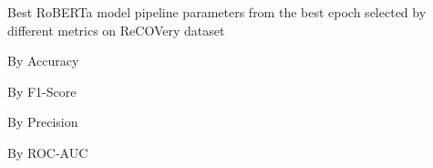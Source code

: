 \begin{table}[!htbp]
    \caption{Best RoBERTa model pipeline parameters from the best epoch selected by different metrics on ReCOVery dataset}
    \label{tab:recovery_roberta_pipeline_params}
    \centering

    \begin{subtable}[t]{0.48\linewidth}
        \scriptsize
        \caption{By Accuracy}
        
    \end{subtable}
    \hfill
    \begin{subtable}[t]{0.48\linewidth}
        \scriptsize
        \caption{By F1-Score}
        
    \end{subtable}

    \vspace{1em}

    \begin{subtable}[t]{0.48\linewidth}
        \scriptsize
        \caption{By Precision}
        
    \end{subtable}
    \hfill
    \begin{subtable}[t]{0.48\linewidth}
        \scriptsize
        \caption{By ROC-AUC}
        
    \end{subtable}

\end{table}